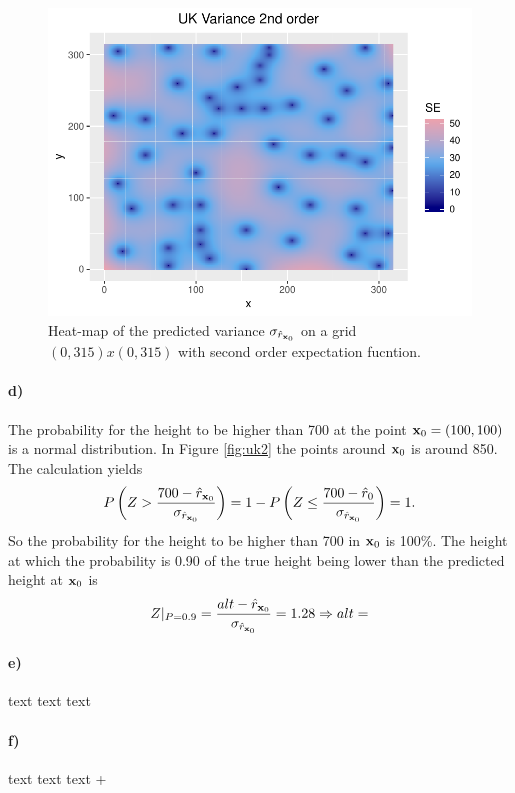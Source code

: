 \begin{figure}[htb]
    \centering
    \includegraphics{figures/uk2se.pdf}
    \caption{Heat-map of the predicted variance $\sigma_{\hat{r}_{\boldsymbol{\mathbf{x}}_0}}$ on a grid $(0,315)x(0,315)$ with second order expectation fucntion.}
    \label{fig:uk2se}
\end{figure}

\paragraph{d)}
The probability for the height to be higher than 700 at the point $\boldsymbol{\mathbf{x}}_0 = (100,100)$ is a normal distribution. In Figure \ref{fig:uk2} the points around $\boldsymbol{\mathbf{x}}_0$ is around 850. The calculation yields 
\begin{equation*}
    P\left(Z>\frac{700 - \hat{r}_{\boldsymbol{\mathbf{x}}_0}}{\sigma_{\hat{r}_{\boldsymbol{\mathbf{x}}_0}}}\right) = 1-P\left(Z\leq\frac{700 - \hat{r}_0}{\sigma_{\hat{r}_{\boldsymbol{\mathbf{x}}_0}}}\right) = 1.
\end{equation*}
So the probability for the height to be higher than 700 in $\boldsymbol{\mathbf{x}}_0$ is 100\%.
The height at which the probability is 0.90 of the true height being lower than the predicted height at $\boldsymbol{\mathbf{x}}_0$ is
\begin{equation*}
    Z|_{P = 0.9} = \frac{alt - \hat{r}_{\boldsymbol{\mathbf{x}}_0}}{\sigma_{\hat{r}_{\boldsymbol{\mathbf{x}}_0}}} = 1.28 \Rightarrow alt = 
\end{equation*}


\paragraph{e)}
text text text

\paragraph{f)}
text text text
+